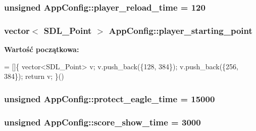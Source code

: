 \subsubsection[{player\+\_\+reload\+\_\+time}]{\setlength{\rightskip}{0pt plus 5cm}unsigned App\+Config\+::player\+\_\+reload\+\_\+time = 120\hspace{0.3cm}{\ttfamily [static]}}\label{class_app_config_a623d06a5d3749f2f4177b9017b54fd9d}
\hypertarget{class_app_config_a142c3a4707dab014b2056e426d77a67d}{}
\subsubsection[{player\+\_\+starting\+\_\+point}]{\setlength{\rightskip}{0pt plus 5cm}vector$<$ S\+D\+L\+\_\+\+Point $>$ App\+Config\+::player\+\_\+starting\+\_\+point\hspace{0.3cm}{\ttfamily [static]}}\label{class_app_config_a142c3a4707dab014b2056e426d77a67d}
{\bfseries Wartość początkowa\+:}
\begin{DoxyCode}
=
[]\{
    vector<SDL\_Point> v;
    v.push\_back(\{128, 384\});
    v.push\_back(\{256, 384\});
    \textcolor{keywordflow}{return} v;
\}()
\end{DoxyCode}
\hypertarget{class_app_config_a208cb555bfc7a1945334368c0aba081e}{}
\subsubsection[{protect\+\_\+eagle\+\_\+time}]{\setlength{\rightskip}{0pt plus 5cm}unsigned App\+Config\+::protect\+\_\+eagle\+\_\+time = 15000\hspace{0.3cm}{\ttfamily [static]}}\label{class_app_config_a208cb555bfc7a1945334368c0aba081e}
\hypertarget{class_app_config_a126c2521d99678ca21d8c83ae41808fb}{}
\subsubsection[{score\+\_\+show\+\_\+time}]{\setlength{\rightskip}{0pt plus 5cm}unsigned App\+Config\+::score\+\_\+show\+\_\+time = 3000\hspace{0.3cm}{\ttfamily [static]}}\label{class_app_config_a126c2521d99678ca21d8c83ae41808fb}
\hypertarget{class_app_config_a9ebca92d71f6aa8b351f675db12d2c80}{}
